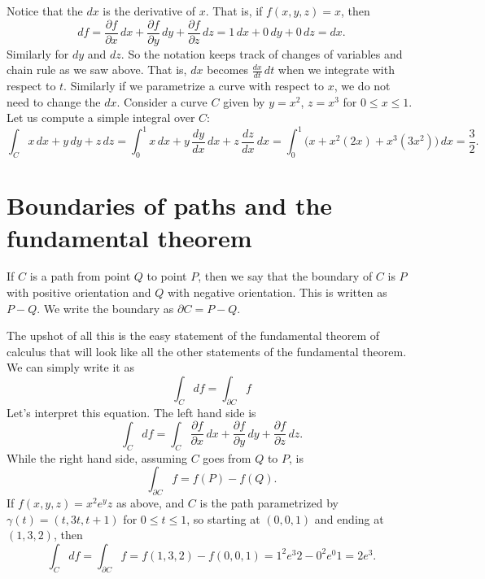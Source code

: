 \documentclass[12pt]{article}
\begin{document}
Notice that the $dx$ is the derivative of $x$.  That is, if $f(x,y,z) = x$, then
$$
df =
\frac{\partial f}{\partial x}\, dx + 
\frac{\partial f}{\partial y}\, dy + 
\frac{\partial f}{\partial z}\, dz =
1\, dx + 
0\, dy + 
0\, dz = dx .
$$
Similarly for $dy$ and $dz$.  So the notation keeps track of changes of
variables and chain rule as we saw above.  That is, $dx$ becomes
$\frac{dx}{dt} \, dt$ when we integrate with respect to $t$.  Similarly if we
parametrize a curve with respect to $x$, we do not need to change the $dx$.
Consider a curve $C$
given by $y=x^2$, $z=x^3$ for $0 \leq x \leq 1$.  Let us compute a
simple integral over $C$:
\begin{equation*}
\int_C x \, dx + y \, dy + z \, dz
=
\int_0^1 x \, dx + y \, \frac{dy}{dx} \, dx + z \, \frac{dz}{dx} \, dx
=
\int_0^1 \bigl( x + x^2 (2x) + x^3 (3x^2) \bigr) \, dx
=
\frac{3}{2} .
\end{equation*}

\section*{Boundaries of paths and the fundamental theorem}

If $C$ is a path from point $Q$ to point $P$, then we say that the boundary
of $C$ is $P$ with positive orientation and $Q$ with negative orientation.
This is written as $P-Q$.  We write the boundary as $\partial C = P-Q$.

The upshot of all this is the easy statement of the fundamental theorem
of calculus that will look like all the other statements of the fundamental
theorem.  We can simply write it as
\[
\int_C df = \int_{\partial C} f
\]
Let's interpret this equation.  The left hand side is
\[
\int_C df = \int_C \frac{\partial f}{\partial x}\, dx + 
\frac{\partial f}{\partial y}\, dy + 
\frac{\partial f}{\partial z}\, dz .
\]
While the right hand side, assuming $C$ goes from $Q$ to $P$, is
\[
\int_{\partial C} f = f(P) - f(Q) .
\]
If $f(x,y,z) = 
x^2e^yz$ as above, and $C$ is the path parametrized by
$\gamma(t) = (t,3t,t+1)$ for $0 \leq t \leq 1$, so starting at $(0,0,1)$ and ending
at $(1,3,2)$, then
\[
\int_C df = \int_{\partial C} f = f(1,3,2)-f(0,0,1) = 1^2 e^3 2 - 0^2e^0 1 =
2e^3.
\]
\end{document}
